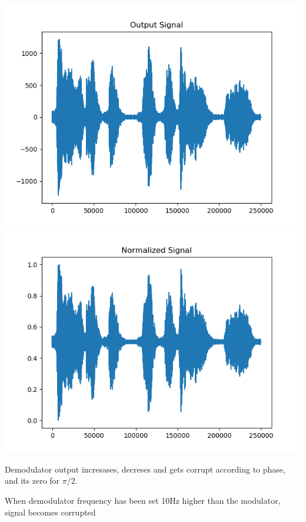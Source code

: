 \documentclass{article}
\begin{document}
	\includegraphics[scale=0.4]{output}
	\includegraphics[scale=0.4]{normalized}
	\par 
	
	Demodulator output incresases, decreses and gets corrupt according to phase, and its zero for $\pi/2$.
	
	\par 
	
	When demodulator frequency has been set 10Hz higher than the modulator, signal becomes corrupted	
	
		  
	\par
\end{document}
